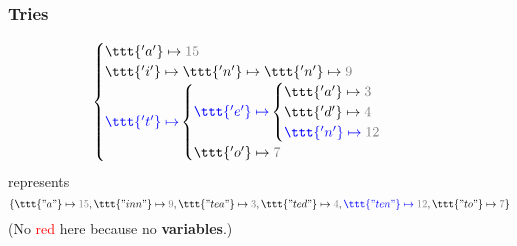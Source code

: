 \begin{frame}
\frametitle{Tries}
\[
\begin{cases}
   \ttt{'a'} \mapsto \textcolor{gray}{15} \\
   \ttt{'i'} \mapsto \ttt{'n'} \mapsto \ttt{'n'} \mapsto \textcolor{gray}{9} \\
   \textcolor{blue}{\ttt{'t'} \mapsto}
   \begin{cases}
      \textcolor{blue}{\ttt{'e'} \mapsto}
      \begin{cases}
          \ttt{'a'} \mapsto \textcolor{gray}{3} \\
          \ttt{'d'} \mapsto \textcolor{gray}{4} \\
          \textcolor{blue}{\ttt{'n'} \mapsto \textcolor{gray}{12}}
      \end{cases} \\
      \ttt{'o'} \mapsto \textcolor{gray}{7}
   \end{cases}
\end{cases}
\]
represents
\[\{
\ttt{"a"} \mapsto \textcolor{gray}{15},
\ttt{"inn"} \mapsto \textcolor{gray}{9},
\ttt{"tea"} \mapsto \textcolor{gray}{3},
\ttt{"ted"} \mapsto \textcolor{gray}{4},
\textcolor{blue}{\ttt{"ten"} \mapsto \textcolor{gray}{12}},
\ttt{"to"} \mapsto \textcolor{gray}{7}
\}\]
(No \textcolor{red}{red} here because no \textbf{variables}.)
\end{frame}
